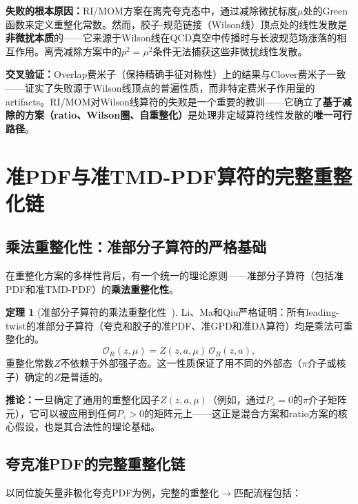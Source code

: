 \documentclass[12pt,a4paper]{ctexart}
\theoremstyle{definition}
\newtheorem{theorem}{定理}[section]
\begin{document}
\textbf{失败的根本原因：}RI/MOM方案在离壳夸克态中，通过减除微扰标度$\mu$处的Green函数来定义重整化常数。然而，胶子-规范链接（Wilson线）顶点处的线性发散是\textbf{非微扰本质}的——它来源于Wilson线在QCD真空中传播时与长波规范场涨落的相互作用。离壳减除方案中的$p^2 = \mu^2$条件无法捕获这些非微扰线性发散。

\textbf{交叉验证：}Overlap费米子（保持精确手征对称性）上的结果与Clover费米子一致——证实了失败源于Wilson线顶点的普遍性质，而非特定费米子作用量的artifacts。RI/MOM对Wilson线算符的失败是一个重要的教训——它确立了\textbf{基于减除的方案（ratio、Wilson圈、自重整化）}是处理非定域算符线性发散的\textbf{唯一可行路径}。

\section{准PDF与准TMD-PDF算符的完整重整化链}

\subsection{乘法重整化性：准部分子算符的严格基础}

在重整化方案的多样性背后，有一个统一的理论原则——准部分子算符（包括准PDF和准TMD-PDF）的\textbf{乘法重整化性}。

\begin{theorem}[准部分子算符的乘法重整化性~\cite{Li2019multiplicative}]
Li、Ma和Qiu严格证明：所有leading-twist的准部分子算符（夸克和胶子的准PDF、准GPD和准DA算符）均是乘法可重整化的。
\begin{equation}
\mathcal{O}_R(z, \mu) = Z(z, a, \mu) \, \mathcal{O}_B(z, a),
\label{eq:multiplicative_renorm}
\end{equation}
重整化常数$Z$不依赖于外部强子态。这一性质保证了用不同的外部态（$\pi$介子或核子）确定的$Z$是普适的。
\end{theorem}

\textbf{推论：}一旦确定了通用的重整化因子$Z(z, a, \mu)$（例如，通过$P_z=0$的$\pi$介子矩阵元），它可以被应用到任何$P_z>0$的矩阵元上——这正是混合方案和ratio方案的核心假设，也是其合法性的理论基础。

\subsection{夸克准PDF的完整重整化链}

以同位旋矢量非极化夸克PDF为例，完整的重整化$\to$匹配流程包括：
\end{document}
